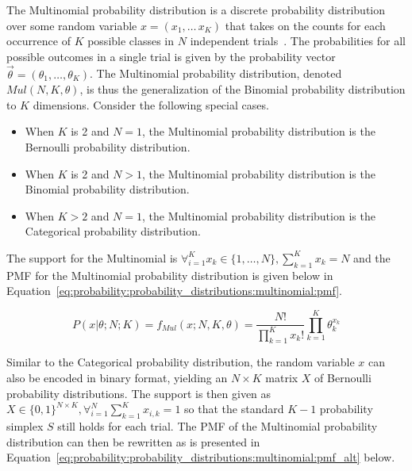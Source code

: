 The Multinomial probability distribution is a discrete probability distribution over some random variable $x = (x_{1}, \dots\, x_{K})$ that takes on the counts for each occurrence of $K$ possible classes in $N$ independent trials~\cite{ref:wackerly:2014}. The probabilities for all possible outcomes in a single trial is given by the probability vector $\vec{\theta} = (\theta_{1}, \dots, \theta_{K})$. The Multinomial probability distribution, denoted $Mul(N, K, \theta)$, is thus the generalization of the Binomial probability distribution to $K$ dimensions. Consider the following special cases.

\begin{itemize}
      \item When $K$ is 2 and $N = 1$, the Multinomial probability distribution is the Bernoulli probability distribution.
      \item When $K$ is 2 and $N > 1$, the Multinomial probability distribution is the Binomial probability distribution.
      \item When $K > 2$ and $N = 1$, the Multinomial probability distribution is the Categorical probability distribution.
\end{itemize}

\noindent
The support for the Multinomial is $\forall_{i=1}^{K} x_{k} \in \{1, \dots, N\}, \sum_{k=1}^{K}x_{k} = N$ and the \acs{PMF} for the Multinomial probability distribution is given below in Equation~\eqref{eq:probability:probability_distributions:multinomial:pmf}.

\begin{equation}
      \label{eq:probability:probability_distributions:multinomial:pmf}
      P(x \vert \theta; N; K) = f_{Mul}(x; N, K, \theta) = \frac{N!}{\prod_{k=1}^{K}x_{k}!} \prod_{k=1}^{K}\theta_{k}^{x_{k}}
\end{equation}

\noindent
Similar to the Categorical probability distribution, the random variable $x$ can also be encoded in binary format, yielding an $N \times K$ matrix $X$ of Bernoulli probability distributions. The support is then given as $X \in \{0, 1\}^{N \times K}, \forall_{i=1}^{N}\sum_{k=1}^{K} x_{i,k} = 1$ so that the standard $K-1$ probability simplex $S$ still holds for each trial. The \acs{PMF} of the Multinomial probability distribution can then be rewritten as is presented in Equation~\eqref{eq:probability:probability_distributions:multinomial:pmf_alt} below.

